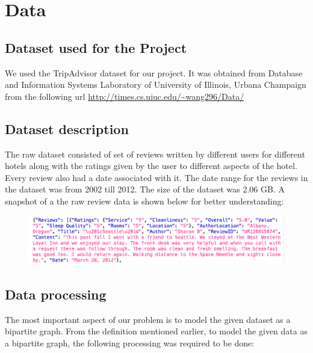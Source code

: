 \documentclass[letterpaper,twocolumn,11pt]{article}
\begin{document}
\section{Data}

\subsection{Dataset used for the Project}
We used the TripAdvisor dataset for our project. It was obtained from Database and Information Systems Laboratory of University of Illinois, Urbana Champaign from the following url \url{http://times.cs.uiuc.edu/~wang296/Data/}

\subsection{Dataset description}
The raw dataset consisted of set of reviews written by different users for different hotels along with the ratings given by the user to different aspects of the hotel. Every review also had a date associated with it. The date range for the reviews in the dataset was from 2002 till 2012. The size of the dataset was 2.06 GB. A snapshot of a the raw review data is shown below for better understanding:


\begin{figure}[H]
\begin{center}
\includegraphics[width=1\linewidth]{images/raw_data.png}
\label{fig:status}
\end{center}
\end{figure}


\subsection{Data processing}
The most important aspect of our problem is to model the given dataset as a bipartite graph. From the definition mentioned earlier, to model the given data as a bipartite graph, the following processing was required to be done:
\end{document}
